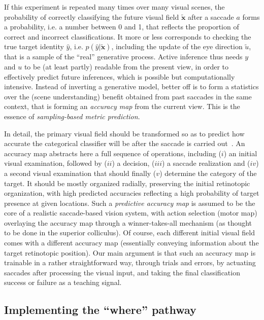 If this experiment is repeated many times over many visual scenes, the probability of correctly classifying the future visual field $\tilde{\boldsymbol{x}}$ after a saccade $a$ forms a probability, i.e. a number between 0 and 1, that reflects the proportion of correct and incorrect classifications.
It more or less corresponds to checking the true target identity $\hat{y}$, i.e. $p(\hat{y}|\tilde{\boldsymbol{x}})$, including the update of the eye direction $\tilde{u}$, that is a sample of the ``real'' generative process. Active inference thus needs $y$ and $u$ to be (at least partly) readable from the present view, in order to effectively predict future inferences, which is possible but computationally intensive.   
Instead of inverting a generative model, better off is to form a statistics over the (scene understanding) benefit obtained from past saccades in the same context, that is forming an \emph{accuracy map} from the current view. This is the essence of \emph{sampling-based metric prediction}.

In detail, the primary visual field should be transformed so as to predict how accurate the categorical classifier will be after the saccade is carried out~\citep{Dauce18}. %
An accuracy map abstracts here a full sequence of operations, including ($i$) an initial visual examination, followed by ($ii$) a decision, ($iii$) a saccade realization and ($iv$) a second visual examination that should finally ($v$) determine the category of the target.
It should be mostly organized radially, preserving the initial retinotopic organization, with high predicted accuracies reflecting a high probability of target presence at given locations.
Such  a \emph{predictive accuracy map} is assumed to be the core of a realistic saccade-based vision system, with action selection (motor map) overlaying the accuracy map through a winner-takes-all mechanism (as thought to be done in the superior colliculus). Of course, each different initial visual field comes with a different accuracy map (essentially conveying information about the target retinotopic position).
Our main argument is that such an accuracy map is trainable in a rather straightforward way, through trials and errors, by actuating saccades after processing the visual input, and taking the final classification success or failure as a teaching signal.

\subsection{Implementing the ``where'' pathway}

